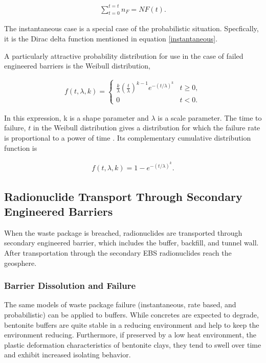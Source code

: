 \begin{align}
  \sum_{t=0}^{t=t}n_F=NF(t).
  \label{cdf}
\end{align}

The instantaneous case is a special case of the probabilistic situation. 
Specfically, it is the Dirac delta function mentioned in equation 
\eqref{instantaneous}.

A particularly attractive probability distribution for use in the case of failed 
engineered barriers is the Weibull distribution, 

\begin{align}
  f(t,\lambda,k) =  \begin{cases}
    \frac{k}{\lambda}\left(\frac{t}{\lambda}\right)^{k-1}e^{-(t/\lambda)^{k}} & 
    t\geq0 ,\\
    0 & t<0 .\end{cases}
  \label{weibullpdf}
\end{align}


In this expression, k is a shape parameter and $\lambda$ is a scale
parameter. The time to failure, $t$ in the Weibull distribution gives a 
distribution for which the failure rate is proportional to a power of time 
\cite{papoulis_probability_2002}. Its complementary cumulative distribution
function is 

\begin{align}
  f(t,\lambda,k) = 1-e^{-(t/\lambda)^k}.
  \label{weibullcdf}
\end{align}



\subsection{Radionuclide Transport Through Secondary Engineered Barriers}

When the waste package is breached, radionuclides are transported through secondary 
engineered barrier, which includes the buffer, backfill, and tunnel wall. After 
transportation through the secondary EBS radionuclides reach the geosphere. 

\subsubsection{Barrier Dissolution and Failure}

The same models of waste package failure (instantaneous, rate based, and 
probabilistic) can be applied to buffers. While concretes are expected to 
degrade, bentonite buffers are quite stable in a reducing environment and help 
to keep the environment reducing. Furthermore, if preserved by  a low heat 
environment, the plastic deformation characteristics of bentonite clays,
they tend to swell over time and exhibit increased isolating behavior.

